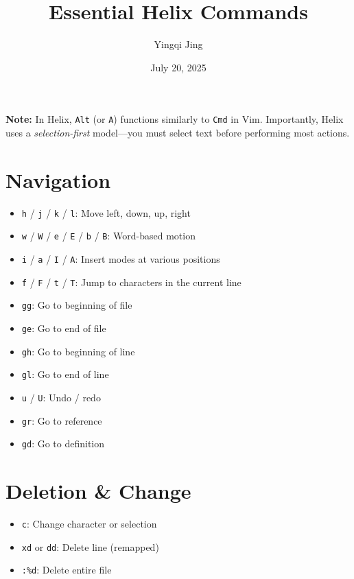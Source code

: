 \documentclass[
  letterpaper,
  DIV=11,
  numbers=noendperiod]{scrartcl}
\title{Essential Helix Commands}
\author{Yingqi Jing}
\date{July 20, 2025}
\providecommand{\tightlist}{%
  \setlength{\itemsep}{0pt}\setlength{\parskip}{0pt}}\usepackage{longtable,booktabs,array}
\renewcommand*\contentsname{Table of contents}
\newcommand\contentsname{Table of contents}
\begin{document}
\maketitle

\renewcommand*\contentsname{Contents}
{
\hypersetup{linkcolor=}
\setcounter{tocdepth}{4}
\tableofcontents
}
\listoffigures
\listoftables

\clearpage

\textbf{Note:} In Helix, \texttt{Alt} (or \texttt{A}) functions
similarly to \texttt{Cmd} in Vim. Importantly, Helix uses a
\emph{selection-first} model---you must select text before performing
most actions.

\section{Navigation}\label{navigation}

\begin{itemize}
\tightlist
\item
  \texttt{h} / \texttt{j} / \texttt{k} / \texttt{l}: Move left, down,
  up, right
\item
  \texttt{w} / \texttt{W} / \texttt{e} / \texttt{E} / \texttt{b} /
  \texttt{B}: Word-based motion
\item
  \texttt{i} / \texttt{a} / \texttt{I} / \texttt{A}: Insert modes at
  various positions
\item
  \texttt{f} / \texttt{F} / \texttt{t} / \texttt{T}: Jump to characters
  in the current line
\item
  \texttt{gg}: Go to beginning of file
\item
  \texttt{ge}: Go to end of file
\item
  \texttt{gh}: Go to beginning of line
\item
  \texttt{gl}: Go to end of line
\item
  \texttt{u} / \texttt{U}: Undo / redo
\item
  \texttt{gr}: Go to reference
\item
  \texttt{gd}: Go to definition
\end{itemize}

\section{Deletion \& Change}\label{deletion-change}

\begin{itemize}
\tightlist
\item
  \texttt{c}: Change character or selection
\item
  \texttt{xd} or \texttt{dd}: Delete line (remapped)
\item
  \texttt{:\%d}: Delete entire file
\end{itemize}
\end{document}
